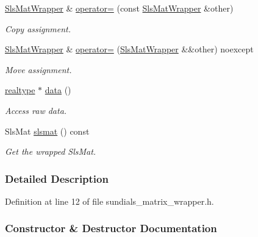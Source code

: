 \begin{DoxyCompactItemize}
\mbox{\hyperlink{classamici_1_1_sls_mat_wrapper}{Sls\+Mat\+Wrapper}} \& \mbox{\hyperlink{classamici_1_1_sls_mat_wrapper_a72d164abd031c6f8a0c675dc9b1e162d}{operator=}} (const \mbox{\hyperlink{classamici_1_1_sls_mat_wrapper}{Sls\+Mat\+Wrapper}} \&other)
\begin{DoxyCompactList}\small\item\em Copy assignment. \end{DoxyCompactList}\item 
\mbox{\hyperlink{classamici_1_1_sls_mat_wrapper}{Sls\+Mat\+Wrapper}} \& \mbox{\hyperlink{classamici_1_1_sls_mat_wrapper_a6c2b446ec62b8131d8de000e691391a7}{operator=}} (\mbox{\hyperlink{classamici_1_1_sls_mat_wrapper}{Sls\+Mat\+Wrapper}} \&\&other) noexcept
\begin{DoxyCompactList}\small\item\em Move assignment. \end{DoxyCompactList}\item 
\mbox{\hyperlink{namespaceamici_a1bdce28051d6a53868f7ccbf5f2c14a3}{realtype}} $\ast$ \mbox{\hyperlink{classamici_1_1_sls_mat_wrapper_ace31bbb9df6dd42f70286108ecafa01b}{data}} ()
\begin{DoxyCompactList}\small\item\em Access raw data. \end{DoxyCompactList}\item 
Sls\+Mat \mbox{\hyperlink{classamici_1_1_sls_mat_wrapper_ae1d2d562c699946445244cca406c4994}{slsmat}} () const
\begin{DoxyCompactList}\small\item\em Get the wrapped Sls\+Mat. \end{DoxyCompactList}\end{DoxyCompactItemize}


\subsubsection{Detailed Description}


Definition at line 12 of file sundials\+\_\+matrix\+\_\+wrapper.\+h.



\subsubsection{Constructor \& Destructor Documentation}
\mbox{\label{classamici_1_1_sls_mat_wrapper_adee74983e392e0c81240530278a3eddb}} 
